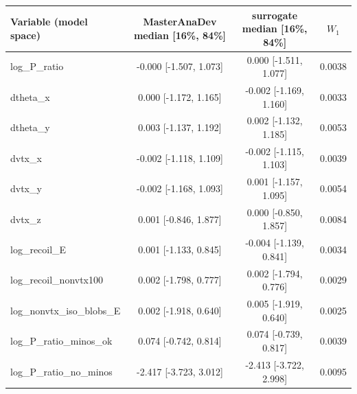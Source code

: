 \begin{tabular}{lccc}
\toprule
Variable (model space) & MasterAnaDev median [16\%, 84\%] & surrogate median [16\%, 84\%] & $W_1$ \\
\midrule
log\_P\_ratio & -0.000 [-1.507, 1.073] & 0.000 [-1.511, 1.077] & 0.0038 \\
dtheta\_x & 0.000 [-1.172, 1.165] & -0.002 [-1.169, 1.160] & 0.0033 \\
dtheta\_y & 0.003 [-1.137, 1.192] & 0.002 [-1.132, 1.185] & 0.0053 \\
dvtx\_x & -0.002 [-1.118, 1.109] & -0.002 [-1.115, 1.103] & 0.0039 \\
dvtx\_y & -0.002 [-1.168, 1.093] & 0.001 [-1.157, 1.095] & 0.0054 \\
dvtx\_z & 0.001 [-0.846, 1.877] & 0.000 [-0.850, 1.857] & 0.0084 \\
log\_recoil\_E & 0.001 [-1.133, 0.845] & -0.004 [-1.139, 0.841] & 0.0034 \\
log\_recoil\_nonvtx100 & 0.002 [-1.798, 0.777] & 0.002 [-1.794, 0.776] & 0.0029 \\
log\_nonvtx\_iso\_blobs\_E & 0.002 [-1.918, 0.640] & 0.005 [-1.919, 0.640] & 0.0025 \\
log\_P\_ratio\_minos\_ok & 0.074 [-0.742, 0.814] & 0.074 [-0.739, 0.817] & 0.0039 \\
log\_P\_ratio\_no\_minos & -2.417 [-3.723, 3.012] & -2.413 [-3.722, 2.998] & 0.0095 \\
\bottomrule
\end{tabular}
